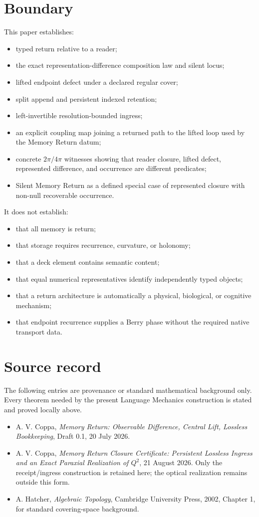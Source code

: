 \documentclass[11pt]{article}
\begin{document}
\section{Boundary}
This paper establishes:
\begin{itemize}
\item typed return relative to a reader;
\item the exact representation-difference composition law and silent locus;
\item lifted endpoint defect under a declared regular cover;
\item split append and persistent indexed retention;
\item left-invertible resolution-bounded ingress;
\item an explicit coupling map joining a returned path to the lifted loop used by the Memory Return datum;
\item concrete $2\pi/4\pi$ witnesses showing that reader closure, lifted defect, represented difference, and occurrence are different predicates;
\item Silent Memory Return as a defined special case of represented closure with non-null recoverable occurrence.
\end{itemize}
It does not establish:
\begin{itemize}
\item that all memory is return;
\item that storage requires recurrence, curvature, or holonomy;
\item that a deck element contains semantic content;
\item that equal numerical representatives identify independently typed objects;
\item that a return architecture is automatically a physical, biological, or cognitive mechanism;
\item that endpoint recurrence supplies a Berry phase without the required native transport data.
\end{itemize}

\section*{Source record}
The following entries are provenance or standard mathematical background only. Every theorem needed by the present Language Mechanics construction is stated and proved locally above.
\begin{itemize}
\item A. V. Coppa, \emph{Memory Return: Observable Difference, Central Lift, Lossless Bookkeeping}, Draft 0.1, 20 July 2026.
\item A. V. Coppa, \emph{Memory Return Closure Certificate: Persistent Lossless Ingress and an Exact Paraxial Realization of $Q^2$}, 21 August 2026. Only the receipt/ingress construction is retained here; the optical realization remains outside this form.
\item A. Hatcher, \emph{Algebraic Topology}, Cambridge University Press, 2002, Chapter 1, for standard covering-space background.
\end{itemize}
\end{document}
